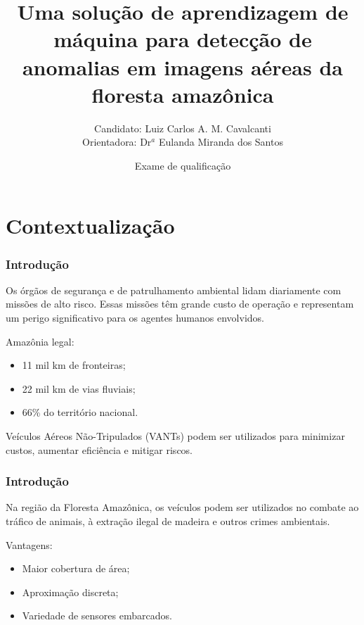 \documentclass[t]{beamer}
\title %
{Uma solução de aprendizagem de máquina para detecção de anomalias em imagens aéreas da floresta amazônica}
\author %
{Candidato: Luiz Carlos A. M. Cavalcanti
\\Orientadora: Dr$^a$ Eulanda Miranda dos Santos} %
\date[] %
{Exame de qualificação}
\begin{document}
  \begin{frame}\titlepage\end{frame}


\section{Contextualização}

\begin{frame}
\frametitle{Introdução}
Os órgãos de segurança e de patrulhamento ambiental lidam diariamente com missões de alto risco. Essas missões têm grande custo de operação e representam um perigo significativo para os agentes humanos envolvidos. 

\vspace{0.5cm}

Amazônia legal: 

\begin{itemize}
	\item 11 mil km de fronteiras;
	\item 22 mil km de vias fluviais;
	\item 66\% do território nacional.
\end{itemize}

\vspace{0.5cm}

Veículos Aéreos Não-Tripulados (VANTs) podem ser utilizados para minimizar custos, aumentar eficiência e mitigar riscos.
\end{frame}


\begin{frame}
\frametitle{Introdução}

Na região da Floresta Amazônica, os veículos podem ser utilizados no combate ao tráfico de animais, à extração ilegal de madeira e outros crimes ambientais. %

\vspace{0.5cm}

Vantagens:
\begin{itemize}
	\item Maior cobertura de área;
	\item Aproximação discreta;
	\item Variedade de sensores embarcados.
\end{itemize}

\end{frame}
\end{document}
